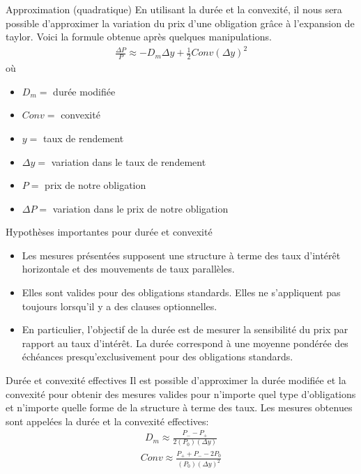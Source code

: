 \documentclass[11pt]{beamer}
\begin{document}
\begin{frame}{Approximation (quadratique)}
En utilisant la durée et la convexité,  il nous sera possible d'approximer la variation du prix d'une obligation grâce à l'expansion de taylor.  Voici la formule obtenue après quelques manipulations.
\begin{align*}
\frac{\Delta P}{P} \approx -D_m \Delta y +\frac{1}{2} Conv(\Delta y)^2
\end{align*}
où 
\begin{itemize}
\item $D_m=$ durée modifiée 
\item $Conv=$ convexité
\item $y=$ taux de rendement 
\item $\Delta y=$ variation dans le taux de rendement 
\item $P=$ prix de notre obligation 
\item $\Delta P=$ variation dans le prix de notre obligation 
\end{itemize}
\end{frame}

\begin{frame}{Hypothèses importantes pour durée et convexité}
\begin{itemize}
\item Les mesures présentées supposent une structure à terme des taux d’intérêt horizontale et des mouvements de taux parallèles.
\item Elles sont valides pour des obligations standards. Elles ne s’appliquent pas toujours lorsqu’il y a des clauses optionnelles.
\item En particulier, l’objectif de la durée est de mesurer la sensibilité du prix par rapport au taux d’intérêt. La durée correspond à une moyenne pondérée des échéances presqu’exclusivement pour des obligations standards.
\end{itemize}
\end{frame}
\begin{frame}{Durée et convexité effectives}
Il est possible d’approximer la durée modifiée et la convexité pour obtenir des mesures valides pour n’importe quel type d’obligations et n’importe quelle forme de la structure à terme des taux. Les mesures obtenues sont appelées la durée et la convexité effectives:
\begin{align*}
D_m \approx \frac{P_{-}-P_{+}}{2(P_0)(\Delta y)}
\end{align*}
\begin{align*}
Conv\approx \frac{P_{+}+P_{-}-2P_0}{(P_0)(\Delta y)^2}
\end{align*}
\end{frame}
\end{document}
